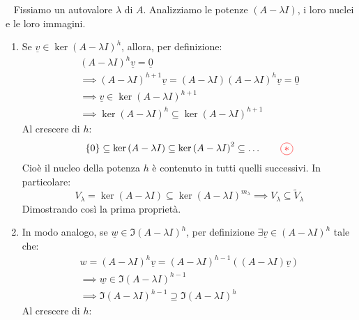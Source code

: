 \begin{demonstration}~{}\label{lemmamichelegiordano}
	Fissiamo un autovalore $\lambda$ di $A$. Analizziamo le potenze $\left(A-\lambda I\right)$, i loro nuclei e le loro immagini.
\begin{enumerate}[label=\Roman*]
	\item Se $\underline{v}\in \ker \left(A-\lambda I\right)^h$, allora, per definizione:
	\begin{equation*}
		\begin{array}{l}
					\left(A-\lambda I\right)^h\underline{v}=\underline{0}\\
			\implies\left(A-\lambda I\right)^{h+1}\underline{v}=\left(A-\lambda I\right)\left(A-\lambda I\right)^h\underline{v}=\underline{0}\\
			\implies \underline{v}\in \ker \left(A-\lambda I\right)^{h+1}\\
			\implies \ker \left(A-\lambda I\right)^h\subseteq \ker \left(A-\lambda I\right)^{h+1}
		\end{array}
	\end{equation*}
Al crescere di $h$:
\begin{equation}
\left\{0\right\}\subseteq \ker \left(A-\lambda I\right)\subseteq\ker \left(A-\lambda I\right)^2\subseteq\ldots \qquad\textcolor{red}{\circled{\ast}} 
\end{equation}
Cioè il nucleo della potenza $h$ è contenuto in tutti quelli successivi. In particolare:
\begin{equation*}\label{kernelsucc}
V_{\lambda}=\ker\left(A-\lambda I\right)\subseteq \ker\left(A-\lambda I\right)^{m_{\lambda}}\implies V_{\lambda}\subseteq \tilde{V}_{\lambda}
\end{equation*}
Dimostrando così la prima proprietà.
\item In modo analogo, se $\underline{w}\in\Im \left(A-\lambda I\right)^h$, per definizione $\exists\underline{v}\in\left(A-\lambda I\right)^h$ tale che:
	\begin{equation*}
	\begin{array}{l}
		w=\left(A-\lambda I\right)^h\underline{v}=\left(A-\lambda I\right)^{h-1}\left(\left(A-\lambda I\right)\underline{v}\right)\\
		\implies \underline{w}\in\Im\left(A-\lambda I\right)^{h-1}\\
		\implies \Im\left(A-\lambda I\right)^{h-1}\supseteq\Im\left(A-\lambda I\right)^h
	\end{array}
\end{equation*}
Al crescere di $h$:
\begin{equation}

\end{equation}
\end{enumerate}
\end{demonstration}
